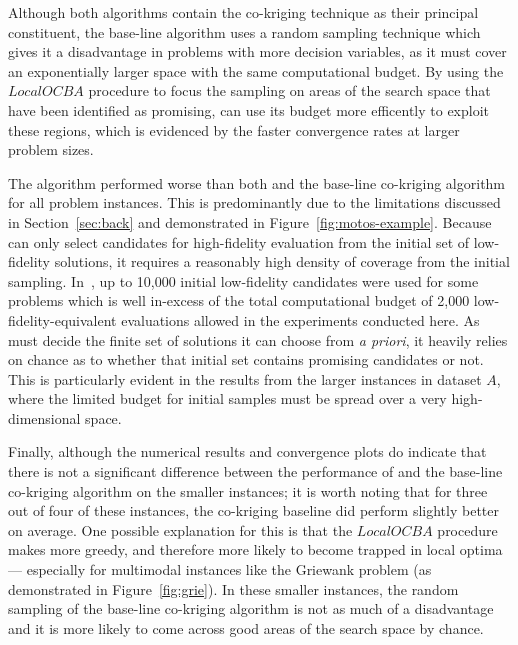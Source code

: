 Although both algorithms contain the co-kriging technique as their principal constituent, the base-line algorithm uses a random sampling technique which gives it a disadvantage in problems with more decision variables, as it must cover an exponentially larger space with the same computational budget. By using the $LocalOCBA$ procedure to focus the sampling on areas of the search space that have been identified as promising, \AlgName{} can use its budget more efficently to exploit these regions, which is evidenced by the faster convergence rates at larger problem sizes. 

The \motos{} algorithm performed worse than both \AlgName{} and the base-line co-kriging algorithm for all problem instances. This is predominantly due to the limitations discussed in Section~\ref{sec:back} and demonstrated in Figure~\ref{fig:motos-example}. Because \motos{} can only select candidates for high-fidelity evaluation from the initial set of low-fidelity solutions, it requires a reasonably high density of coverage from the initial sampling. In~\cite{xu2016mo2tos}, up to 10,000 initial low-fidelity candidates were used for some problems which is well in-excess of the total computational budget of 2,000 low-fidelity-equivalent evaluations allowed in the experiments conducted here. As \motos{} must decide the finite set of solutions it can choose from \emph{a priori}, it heavily relies on chance as to whether that initial set contains promising candidates or not. This is particularly evident in the results from the larger instances in dataset $A$, where the limited budget for initial samples must be spread over a very high-dimensional space.

Finally, although the numerical results and convergence plots do indicate that there is not a significant difference between the performance of \AlgName{} and the base-line co-kriging algorithm on the smaller instances; it is worth noting that for three out of four of these instances, the co-kriging baseline did perform slightly better on average. One possible explanation for this is that the $LocalOCBA$ procedure makes \AlgName{} more greedy, and therefore more likely to become trapped in local optima --- especially for multimodal instances like the Griewank problem (as demonstrated in Figure~\ref{fig:grie}). In these smaller instances, the random sampling of the base-line co-kriging algorithm is not as much of a disadvantage and it is more likely to come across good areas of the search space by chance.